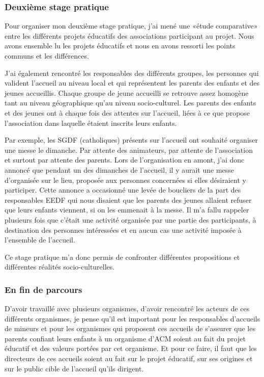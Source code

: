 \documentclass[titlepage,11pt,a4paper]{article}
\begin{document}
\subsubsection{Deuxième stage pratique}

Pour organiser mon deuxième stage pratique, j'ai mené une «étude comparative» entre les
différents projets éducatifs des associations participant au projet. Nous avons ensemble
lu les projets éducatifs et nous en avons ressorti les points communs et les différences.

J'ai également rencontré les responsables des différents groupes, les personnes qui
valident l'accueil au niveau local et qui représentent les parents des enfants et des
jeunes accueillis. Chaque groupe de jeune accueilli se retrouve assez homogène tant au niveau
géographique qu'au niveau socio-culturel. Les parents des enfants et des jeunes ont à
chaque fois des attentes sur l'accueil, liées à ce que propose l'association dans laquelle
étaient inscrits leurs enfants.

Par exemple, les SGDF (catholiques) présents sur l'accueil ont souhaité organiser une
messe le dimanche. Par attente des animateurs, par attente de l'association et surtout
par attente des parents. Lors de l'organisation en amont, j'ai donc annoncé que pendant
un des dimanches de l'accueil, il y aurait une messe d'organisée sur le lieu, proposée aux personnes
concernées si elles désiraient y participer. Cette annonce a occasionné une levée de
boucliers de la part des responsables EEDF qui nous disaient que les parents des jeunes
allaient refuser que leurs enfants viennent, si on les emmenait à la messe. Il m'a fallu
rappeler plusieurs fois que c'était une activité organisée par une partie des
participants, à destination des personnes intéressées et en aucun cas une activité imposée
à l'ensemble de l'accueil.

Ce stage pratique m'a donc permis de confronter différentes propositions et différentes
réalités socio-culturelles.

\subsubsection{En fin de parcours}

D'avoir travaillé avec plusieurs organismes, d'avoir rencontré les acteurs de ces
différents organismes, je pense qu'il est important pour les responsables d'accueils de
mineurs et pour les organismes qui proposent ces accueils de s'assurer que les parents
confiant leurs enfants à un organisme d'ACM soient au fait du projet éducatif et des
valeurs portées par cet organisme. Et pour ce faire, il faut que les directeurs de ces
accueils soient au fait sur le projet éducatif, sur ses origines et sur le public cible de
l'accueil qu'ils dirigent.
\end{document}

